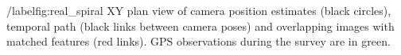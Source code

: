 /label{fig:real_spiral} XY plan view of camera position estimates (black circles), temporal path (black links between camera poses) and overlapping images with matched features (red links). GPS observations during the survey are in green.
  